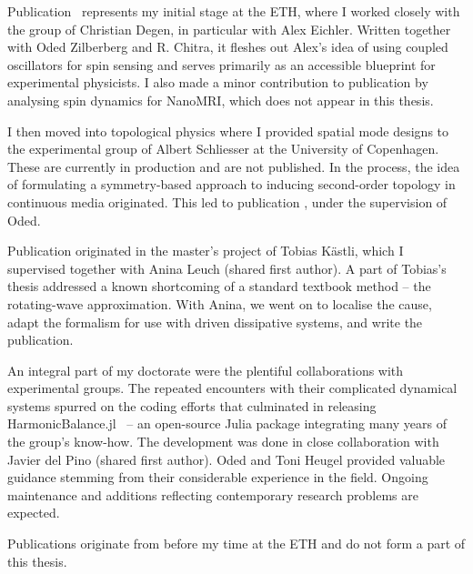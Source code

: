 Publication~\cite{Kosata_2020} represents my initial stage at the ETH, where I worked closely with the group of Christian Degen, in particular with Alex Eichler. Written together with Oded Zilberberg and R. Chitra, it fleshes out Alex's idea of using coupled oscillators for spin sensing and serves primarily as an accessible blueprint for experimental physicists. I also made a minor contribution to publication \cite{Grob_2019} by analysing spin dynamics for NanoMRI, which does not appear in this thesis.

I then moved into topological physics where I provided spatial mode designs to the experimental group of Albert Schliesser at the University of Copenhagen. These are currently in production and are not published. In the process, the idea of formulating a symmetry-based approach to inducing second-order topology in continuous media originated. This led to publication \cite{Kosata_2021}, under the supervision of Oded.

Publication \cite{Kosata_2022b} originated in the master's project of Tobias K\"{a}stli, which I supervised together with Anina Leuch (shared first author). A part of Tobias's thesis addressed a known shortcoming of a standard textbook method -- the rotating-wave approximation. With Anina, we went on to localise the cause, adapt the formalism for use with driven dissipative systems, and write the publication.

An integral part of my doctorate were the plentiful collaborations with experimental groups. The repeated encounters with their complicated dynamical systems spurred on the coding efforts that culminated in releasing HarmonicBalance.jl~\cite{Kosata_2022a} -- an open-source Julia package integrating many years of the group's know-how. The development was done in close collaboration with Javier del Pino (shared first author). Oded and Toni Heugel provided valuable guidance stemming from their considerable experience in the field. Ongoing maintenance and additions reflecting contemporary research problems are expected.

Publications \cite{Kosata_2018a, Kosata_2018b, Nilsen_2017} originate from before my time at the ETH and do not form a part of this thesis.


